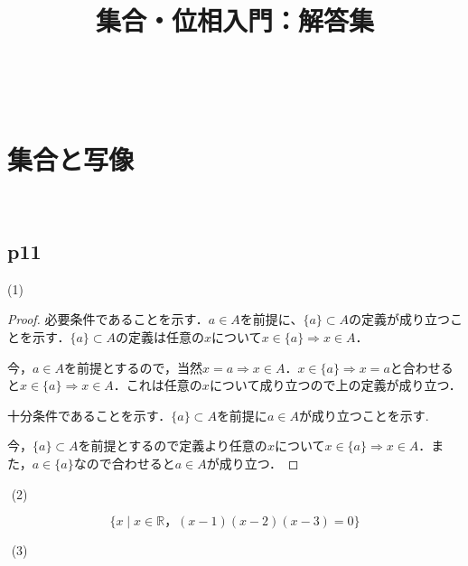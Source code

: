 \documentclass[dvipdfmx,uplatex,11pt]{jsarticle}
\title{集合・位相入門：解答集}
\author{}
\begin{document}
\maketitle
​
\section{集合と写像}
​
\subsection{p11}
(1)\\
\begin{leftbar}
\begin{proof}
必要条件であることを示す．$a \in A$を前提に、$\{ a\} \subset A$の定義が成り立つことを示す．$\{ a \} \subset A$の定義は任意の$x$について$x \in \{a\} \Rightarrow x  \in A$． \par
今，$a \in A$を前提とするので，当然$x=a \Rightarrow x \in A$．$x \in  \{a\} \Rightarrow x=a$と合わせると$x \in \{a\} \Rightarrow x \in A$．これは任意の$x$について成り立つので上の定義が成り立つ．\par
十分条件であることを示す．$\{a\} \subset A$を前提に$a \in A$が成り立つことを示す.\par
今，$\{a\} \subset A$を前提とするので定義より任意の$x$について$x \in \{a\} \Rightarrow x \in A$．また，$a \in \{a\}$なので合わせると$a \in A$が成り立つ．
\end{proof}
\end{leftbar}
​
(2)\\
\begin{leftbar}
    \[
        \{x \mid x \in \mathbb{R}， (x-1)(x-2)(x-3)=0\}
    \]
\end{leftbar}
​
(3)\\
​
\end{document}
